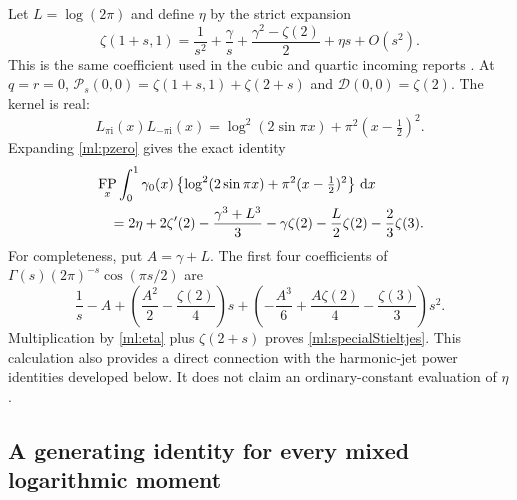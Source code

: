 \documentclass[11pt]{article}
\numberwithin{equation}{section}
\theoremstyle{plain}
\theoremstyle{definition}
\theoremstyle{remark}
\DeclareMathOperator{\FP}{FP}
\newcommand{\ii}{\mathrm i}
\newcommand{\dd}{\,\mathrm d}
\begin{document}
Let $L=\log(2\pi)$ and define $\eta$ by the strict expansion
\begin{equation}\label{ml:eta}
 \zeta(1+s,1)=\frac1{s^2}+\frac\gamma s
       +\frac{\gamma^2-\zeta(2)}2+\eta s+O(s^2).
\end{equation}
This is the same coefficient used in the cubic and quartic incoming
reports \cite{repo:cubic,repo:barnes}. At $q=r=0$,
$\mathcal P_s(0,0)=\zeta(1+s,1)+\zeta(2+s)$ and
$\mathcal D(0,0)=\zeta(2)$. The kernel is real:
\[
 L_{\pi\ii}(x)L_{-\pi\ii}(x)
      =\log^2(2\sin\pi x)+\pi^2(x-\tfrac12)^2.
\]
Expanding \eqref{ml:pzero} gives the exact identity
\begin{align}
 &\FP_x\int_0^1\gamma_0(x)
       \left\{\log^2(2\sin\pi x)+\pi^2(x-\tfrac12)^2\right\}\dd x
       \notag\\
 &\quad=2\eta+2\zeta'(2)-\frac{\gamma^3+L^3}{3}
                -\gamma\zeta(2)-\frac L2\zeta(2)-\frac23\zeta(3).
       \label{ml:specialStieltjes}
\end{align}
For completeness, put $A=\gamma+L$. The first four coefficients of
$\Gamma(s)(2\pi)^{-s}\cos(\pi s/2)$ are
\[
 \frac1s-A+\left(\frac{A^2}{2}-\frac{\zeta(2)}4\right)s
    +\left(-\frac{A^3}{6}+\frac{A\zeta(2)}4-\frac{\zeta(3)}3\right)s^2.
\]
Multiplication by \eqref{ml:eta} plus $\zeta(2+s)$ proves
\eqref{ml:specialStieltjes}. This calculation also provides a direct
connection with the harmonic-jet power identities developed below.
It does not claim an ordinary-constant evaluation of $\eta$.

\subsection{A generating identity for every mixed logarithmic moment}
\end{document}
